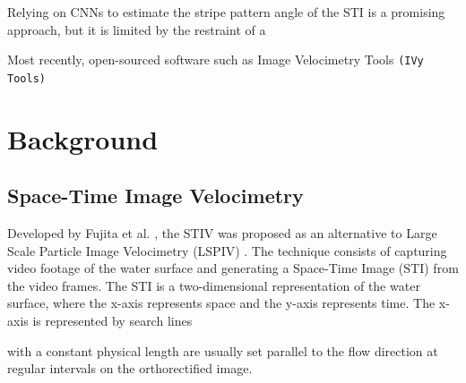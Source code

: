 \documentclass[12pt]{elsarticle}
\begin{document}
Relying on CNNs to estimate the stripe pattern angle of the STI is a promising approach, but it is limited by the restraint of a 

Most recently, open-sourced software such as Image Velocimetry Tools \texttt{(IVy Tools)} \cite{engel2025ivytools}


\section{Background}
\subsection{Space-Time Image Velocimetry}
Developed by Fujita et al. \cite{fujita2007development}, the STIV was proposed as an alternative to Large Scale Particle Image Velocimetry (LSPIV) \cite{fujita1998large}. The technique consists of capturing video footage of the water surface and generating a Space-Time Image (STI) from the video frames. The STI is a two-dimensional representation of the water surface, where the x-axis represents space and the y-axis represents time. The x-axis is represented by search lines

with a constant physical length are usually set parallel to the flow direction at regular intervals on the orthorectified image.
\end{document}
